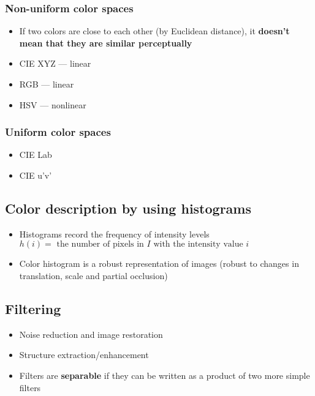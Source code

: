 \documentclass{article}
\begin{document}
                \subsubsection{Non-uniform color spaces}
                \begin{itemize}
                    \item If two colors are close to each other (by Euclidean distance), it \textbf{doesn't mean that they are similar perceptually}
                    \item CIE XYZ --- linear
                    \item RGB --- linear
                    \item HSV --- nonlinear
                \end{itemize}

                \subsubsection{Uniform color spaces}
                \begin{itemize}
                    \item CIE Lab
                    \item CIE u'v'
                \end{itemize}

        \subsection{Color description by using histograms}
        \begin{itemize}
            \item Histograms record the frequency of intensity levels \\
                  $h(i) = \text{ the number of pixels in } I \text{ with the intensity value } i$
            \item Color histogram is a robust representation of images (robust to changes in translation, scale and partial occlusion)
        \end{itemize}

        \subsection{Filtering}
        \begin{itemize}
            \item Noise reduction and image restoration
            \item Structure extraction/enhancement
            \item Filters are \textbf{separable} if they can be written as a product of two more simple filters
        \end{itemize}
\end{document}
